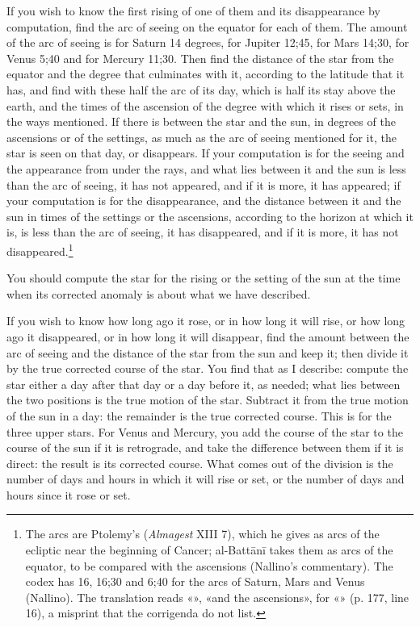 \documentclass[11pt]{article}
\newcommand{\ArPage}[1]{\marginpar{\footnotesize\color{gray}Ar.\,p.\,#1}}
\begin{document}
\par If you wish to know the first rising of one of them and its disappearance by computation, find the arc of seeing on the equator for each of them. The amount of the arc of seeing is for Saturn 14 degrees, for Jupiter 12;45, for Mars 14;30, for Venus 5;40 and for Mercury 11;30. Then find the distance of the star from the equator and the degree that culminates with it, according to the latitude that it has, and find with these half the arc of its day, which is half its stay above the earth, and the times of the ascension of the degree with which it rises or sets, in the ways mentioned. If there is between the star and the sun, in degrees of the ascensions or of the settings, as much as the arc of seeing mentioned for it, the star is seen on that day, or disappears. If your computation is for the seeing and the appearance from under the rays, and what lies between it and the sun is less than the arc of seeing, it has not appeared, and if it is more, it has appeared; if your computation is for the disappearance, and the distance between it and the sun in times of the settings or the ascensions, according to the horizon at which it is, is less than the arc of seeing, it has disappeared, and if it is more, it has not disappeared.\footnote{The arcs are Ptolemy's (\emph{Almagest} XIII 7), which he gives as arcs of the ecliptic near the beginning of Cancer; al-Battānī takes them as arcs of the equator, to be compared with the ascensions (Nallino's commentary). The codex has 16, 16;30 and 6;40 for the arcs of Saturn, Mars and Venus (Nallino). The translation reads «», «and the ascensions», for «» (p. 177, line 16), a misprint that the corrigenda do not list.}\par
\par You should compute the star for the rising or the setting of the sun at the time when its corrected anomaly is about what we have described.\par
\par \ArPage{178}If you wish to know how long ago it rose, or in how long it will rise, or how long ago it disappeared, or in how long it will disappear, find the amount between the arc of seeing and the distance of the star from the sun and keep it; then divide it by the true corrected course of the star. You find that as I describe: compute the star either a day after that day or a day before it, as needed; what lies between the two positions is the true motion of the star. Subtract it from the true motion of the sun in a day: the remainder is the true corrected course. This is for the three upper stars. For Venus and Mercury, you add the course of the star to the course of the sun if it is retrograde, and take the difference between them if it is direct: the result is its corrected course. What comes out of the division is the number of days and hours in which it will rise or set, or the number of days and hours since it rose or set.\par
\end{document}
